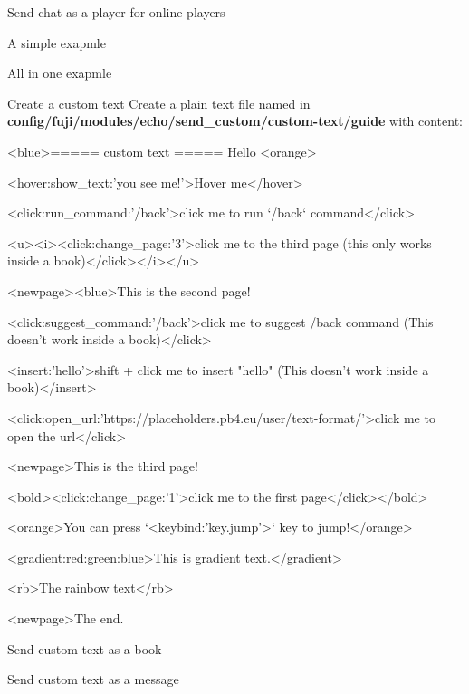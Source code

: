 \begin{example}{Send chat as a player for online players}
\end{example}

\begin{example}{A simple exapmle}
\end{example}

\begin{example}{All in one exapmle}
\end{example}

\begin{example}{Create a custom text}
    Create a plain text file named  in \textbf{config/fuji/modules/echo/send\_custom/custom-text/guide} with content:
    \begin{sh}
        <blue>===== custom text =====
        Hello <orange>%

        <hover:show_text:'you see me!'>Hover me</hover>

        <click:run_command:'/back'>click me to run `/back` command</click>

        <u><i><click:change_page:'3'>click me to the third page (this only works inside a book)</click></i></u>

        <newpage><blue>This is the second page!

        <click:suggest_command:'/back'>click me to suggest /back command (This doesn't work inside a book)</click>

        <insert:'hello'>shift + click me to insert "hello" (This doesn't work inside a book)</insert>

        <click:open_url:'https://placeholders.pb4.eu/user/text-format/'>click me to open the url</click>

        <newpage>This is the third page!

        <bold><click:change_page:'1'>click me to the first page</click></bold>

        <orange>You can press `<keybind:'key.jump'>` key to jump!</orange>

        <gradient:red:green:blue>This is gradient text.</gradient>

        <rb>The rainbow text</rb>

        <newpage>The end.
    \end{sh}
\end{example}

\begin{example}{Send custom text as a book}
\end{example}

\begin{example}{Send custom text as a message}
\end{example}
